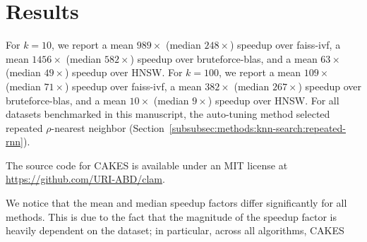 \section{Results}
\label{sec:results}

For $k= 10$, we report a mean $989\times$ (median $248\times$) speedup over faiss-ivf, a mean $1456\times$ (median $582\times$) speedup over bruteforce-blas, 
and a mean $63\times$ (median $49\times$) speedup over HNSW. For $k=100$, we report a mean $109\times$ (median $71\times$) speedup over faiss-ivf, a mean $382\times$ (median $267\times$) speedup over bruteforce-blas, and a mean $10\times$ (median $9\times$) speedup over HNSW.
For all datasets benchmarked in this manuscript, the auto-tuning method selected repeated $\rho$-nearest neighbor (Section~\ref{subsubsec:methods:knn-search:repeated-rnn}).

The source code for CAKES is available under an MIT
license at \url{https://github.com/URI-ABD/clam}.

We notice that the mean and median speedup factors differ significantly for all methods. This is 
due to the fact that the magnitude of the speedup factor is heavily dependent on the dataset; in particular, across all algorithms, CAKES 

